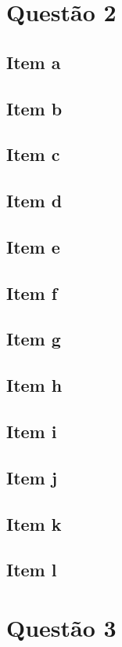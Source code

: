 \documentclass[a4paper, 12pt]{article}
\begin{document}
	\section{Quest\~{a}o 2}
		\subsection{Item a}
		\subsection{Item b}		
		\subsection{Item c}		
		\subsection{Item d}		
		\subsection{Item e}		
		\subsection{Item f}					
		\subsection{Item g}		
		\subsection{Item h}		
		\subsection{Item i}			
		\subsection{Item j}		
		\subsection{Item k}		
		\subsection{Item l}
	
	\section{Quest\~{a}o 3}
\end{document}
